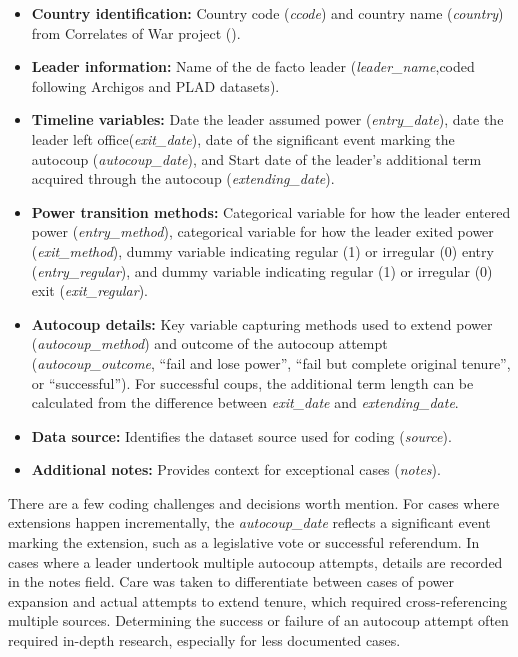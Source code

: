 \documentclass[
  12pt,
]{report}
\begin{document}
\begin{itemize}
\item
  \textbf{Country identification:} Country code (\emph{ccode}) and
  country name (\emph{country}) from Correlates of War project
  ().
\item
  \textbf{Leader information:} Name of the de facto leader
  (\emph{leader\_name},coded following Archigos and PLAD datasets).
\item
  \textbf{Timeline variables:} Date the leader assumed power
  (\emph{entry\_date}), date the leader left office(\emph{exit\_date}),
  date of the significant event marking the autocoup
  (\emph{autocoup\_date}), and Start date of the leader's additional
  term acquired through the autocoup (\emph{extending\_date}).
\item
  \textbf{Power transition methods:} Categorical variable for how the
  leader entered power (\emph{entry\_method}), categorical variable for
  how the leader exited power (\emph{exit\_method}), dummy variable
  indicating regular (1) or irregular (0) entry (\emph{entry\_regular}),
  and dummy variable indicating regular (1) or irregular (0) exit
  (\emph{exit\_regular}).
\item
  \textbf{Autocoup details:} Key variable capturing methods used to
  extend power (\emph{autocoup\_method}) and outcome of the autocoup
  attempt (\emph{autocoup\_outcome}, ``fail and lose power'', ``fail but
  complete original tenure'', or ``successful''). For successful coups,
  the additional term length can be calculated from the difference
  between \emph{exit\_date} and \emph{extending\_date}.
\item
  \textbf{Data source:} Identifies the dataset source used for coding
  (\emph{source}).
\item
  \textbf{Additional notes:} Provides context for exceptional cases
  (\emph{notes}).
\end{itemize}

There are a few coding challenges and decisions worth mention. For cases
where extensions happen incrementally, the \emph{autocoup\_date}
reflects a significant event marking the extension, such as a
legislative vote or successful referendum. In cases where a leader
undertook multiple autocoup attempts, details are recorded in the notes
field. Care was taken to differentiate between cases of power expansion
and actual attempts to extend tenure, which required cross-referencing
multiple sources. Determining the success or failure of an autocoup
attempt often required in-depth research, especially for less documented
cases.
\end{document}
